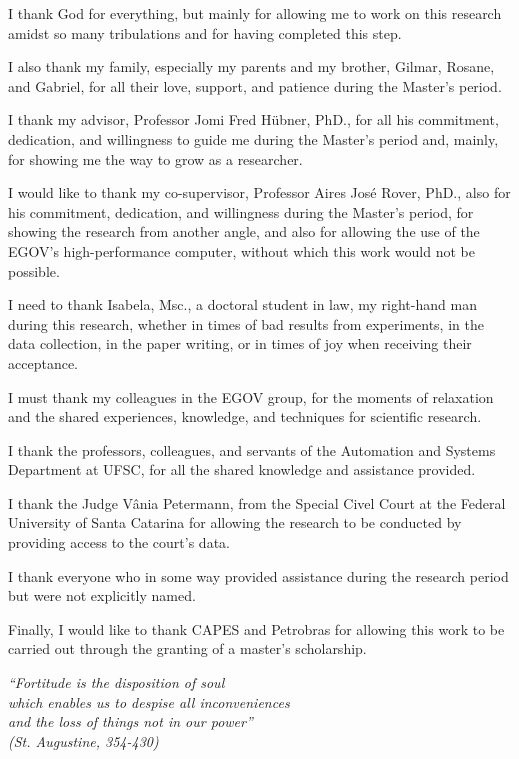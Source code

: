 \begin{agradecimentos}
I thank God for everything, but mainly for allowing me to work on this research amidst so many tribulations and for having completed this step.

I also thank my family, especially my parents and my brother, Gilmar, Rosane, and Gabriel, for all their love, support, and patience during the Master's period.

I thank my advisor, Professor Jomi Fred Hübner, PhD., for all his commitment, dedication, and willingness to guide me during the Master's period and, mainly, for showing me the way to grow as a researcher.

I would like to thank my co-supervisor, Professor Aires José Rover, PhD., also for his commitment, dedication, and willingness during the Master's period, for showing the research from another angle, and also for allowing the use of the EGOV's high-performance computer, without which this work would not be possible. 

I need to thank Isabela, Msc., a doctoral student in law, my right-hand man during this research, whether in times of bad results from experiments, in the data collection, in the paper writing, or in times of joy when receiving their acceptance. 

I must thank my colleagues in the EGOV group, for the moments of relaxation and the shared experiences, knowledge, and techniques for scientific research. 

I thank the professors, colleagues, and servants of the Automation and Systems Department at UFSC, for all the shared knowledge and assistance provided. 

I thank the Judge Vânia Petermann, from the Special Civel Court at the Federal University of Santa Catarina for allowing the research to be conducted by providing access to the court's data.

I thank everyone who in some way provided assistance during the research period but were not explicitly named. 

Finally, I would like to thank CAPES and Petrobras for allowing this work to be carried out through the granting of a master's scholarship. 


 
\end{agradecimentos}

\begin{epigrafe}
	\vspace*{\fill}
	\begin{flushright}
		\textit{``Fortitude is the disposition of soul\\
		which enables us to despise all inconveniences \\
		and the loss of things not in our power''\\
		(St. Augustine, 354-430)}
	\end{flushright}
\end{epigrafe}



